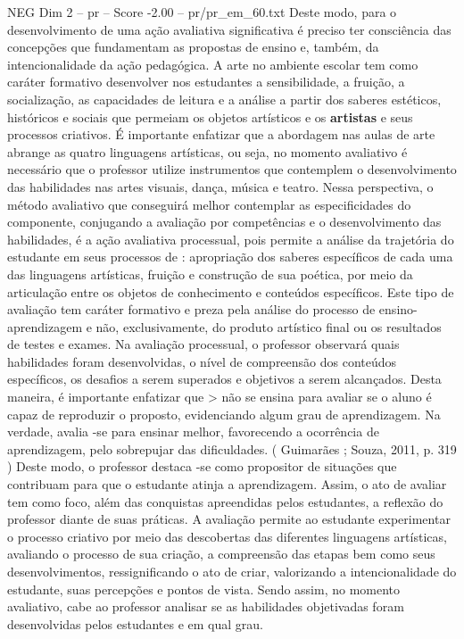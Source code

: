 \begin{textsample}{NEG Dim 2 – pr – Score -2.00 – pr/pr\_em\_60.txt}
Deste modo, para o desenvolvimento de uma ação avaliativa significativa é preciso ter consciência das concepções que fundamentam as propostas de ensino e, também, da intencionalidade da ação pedagógica.
A arte no ambiente escolar tem como caráter formativo desenvolver nos estudantes a sensibilidade, a fruição, a socialização, as capacidades de leitura e a análise a partir dos saberes estéticos, históricos e sociais que permeiam os objetos artísticos e os \textbf{artistas} e seus processos criativos.
É importante enfatizar que a abordagem nas aulas de arte abrange as quatro linguagens artísticas, ou seja, no momento avaliativo é necessário que o professor utilize instrumentos que contemplem o desenvolvimento das habilidades nas artes visuais, dança, música e teatro.
Nessa perspectiva, o método avaliativo que conseguirá melhor contemplar as especificidades do componente, conjugando a avaliação por competências e o desenvolvimento das habilidades, é a ação avaliativa processual, pois permite a análise da trajetória do estudante em seus processos de : apropriação dos saberes específicos de cada uma das linguagens artísticas, fruição e construção de sua poética, por meio da articulação entre os objetos de conhecimento e conteúdos específicos.
Este tipo de avaliação tem caráter formativo e preza pela análise do processo de ensino-aprendizagem e não, exclusivamente, do produto artístico final ou os resultados de testes e exames.
Na avaliação processual, o professor observará quais habilidades foram desenvolvidas, o nível de compreensão dos conteúdos específicos, os desafios a serem superados e objetivos a serem alcançados.
Desta maneira, é importante enfatizar que > não se ensina para avaliar se o aluno é capaz de reproduzir o proposto, evidenciando algum grau de aprendizagem.
Na verdade, avalia -se para ensinar melhor, favorecendo a ocorrência de aprendizagem, pelo sobrepujar das dificuldades. ( Guimarães ; Souza, 2011, p. 319 ) Deste modo, o professor destaca -se como propositor de situações que contribuam para que o estudante atinja a aprendizagem.
Assim, o ato de avaliar tem como foco, além das conquistas apreendidas pelos estudantes, a reflexão do professor diante de suas práticas.
A avaliação permite ao estudante experimentar o processo criativo por meio das descobertas das diferentes linguagens artísticas, avaliando o processo de sua criação, a compreensão das etapas bem como seus desenvolvimentos, ressignificando o ato de criar, valorizando a intencionalidade do estudante, suas percepções e pontos de vista.
Sendo assim, no momento avaliativo, cabe ao professor analisar se as habilidades objetivadas foram desenvolvidas pelos estudantes e em qual grau.

\end{textsample}
